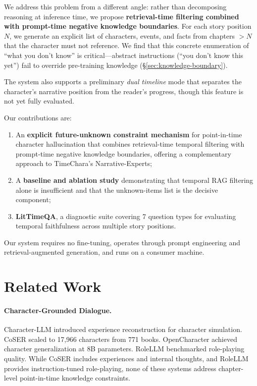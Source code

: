\documentclass[11pt,a4paper]{article}
\begin{document}
We address this problem from a different angle: rather than decomposing reasoning at inference time, we propose \textbf{retrieval-time filtering combined with prompt-time negative knowledge boundaries}.
For each story position $N$, we generate an explicit list of characters, events, and facts from chapters $> N$ that the character must not reference.
We find that this concrete enumeration of ``what you don't know'' is critical---abstract instructions (``you don't know this yet'') fail to override pre-training knowledge (\S\ref{sec:knowledge-boundary}).

The system also supports a preliminary \textit{dual timeline} mode that separates the character's narrative position from the reader's progress, though this feature is not yet fully evaluated.

Our contributions are:
\begin{enumerate}
\setlength\itemsep{0pt}
\item An \textbf{explicit future-unknown constraint mechanism} for point-in-time character hallucination that combines retrieval-time temporal filtering with prompt-time negative knowledge boundaries, offering a complementary approach to TimeChara's Narrative-Experts;
\item A \textbf{baseline and ablation study} demonstrating that temporal RAG filtering alone is insufficient and that the unknown-items list is the decisive component;
\item \textbf{LitTimeQA}, a diagnostic suite covering 7 question types for evaluating temporal faithfulness across multiple story positions.
\end{enumerate}

Our system requires no fine-tuning, operates through prompt engineering and retrieval-augmented generation, and runs on a consumer machine.

\section{Related Work}
\label{sec:related}

\paragraph{Character-Grounded Dialogue.}
Character-LLM \citep{shao2023character} introduced experience reconstruction for character simulation.
CoSER \citep{chen2025coser} scaled to 17,966 characters from 771 books.
OpenCharacter \citep{opencharacter2025} achieved character generalization at 8B parameters.
RoleLLM \citep{wang2024rolellm} benchmarked role-playing quality.
While CoSER includes experiences and internal thoughts, and RoleLLM provides instruction-tuned role-playing, none of these systems address chapter-level point-in-time knowledge constraints.
\end{document}
